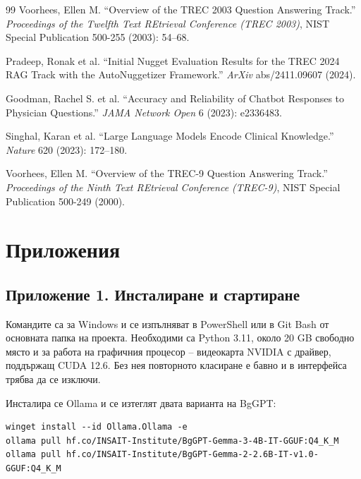 \documentclass[12pt,a4paper]{article}
\makeatletter
\let\origsection\section
\renewcommand{\section}{\clearpage\origsection}
\renewcommand\paragraph{\@startsection{paragraph}{4}{\z@}{1.5ex \@plus .5ex \@minus .2ex}{-1em}{\normalfont\normalsize\bfseries}}
\makeatother
\begin{document}
{\begin{thebibliography}{99}
Voorhees, Ellen M.
“Overview of the TREC 2003 Question Answering Track.”
\emph{Proceedings of the Twelfth Text REtrieval Conference (TREC 2003)}, NIST Special Publication 500-255 (2003): 54--68.

Pradeep, Ronak et al.
“Initial Nugget Evaluation Results for the TREC 2024 RAG Track with the AutoNuggetizer Framework.”
\emph{ArXiv} abs/2411.09607 (2024).

Goodman, Rachel S. et al.
“Accuracy and Reliability of Chatbot Responses to Physician Questions.”
\emph{JAMA Network Open} 6 (2023): e2336483.

Singhal, Karan et al.
“Large Language Models Encode Clinical Knowledge.”
\emph{Nature} 620 (2023): 172--180.

Voorhees, Ellen M.
“Overview of the TREC-9 Question Answering Track.”
\emph{Proceedings of the Ninth Text REtrieval Conference (TREC-9)}, NIST Special Publication 500-249 (2000).

\end{thebibliography}
}

\section*{Приложения}

\subsection*{Приложение 1. Инсталиране и стартиране}
\label{app:install}
Командите са за Windows и се изпълняват в PowerShell или в Git Bash от основната папка на проекта. Необходими са Python 3.11, около 20 GB свободно място и за работа на графичния процесор -- видеокарта NVIDIA с драйвер, поддържащ CUDA 12.6. Без нея повторното класиране е бавно и в интерфейса трябва да се изключи.

\paragraph{1. Генеративен модел.} Инсталира се Ollama и се изтеглят двата варианта на BgGPT:
\begin{lstlisting}
winget install --id Ollama.Ollama -e
ollama pull hf.co/INSAIT-Institute/BgGPT-Gemma-3-4B-IT-GGUF:Q4_K_M
ollama pull hf.co/INSAIT-Institute/BgGPT-Gemma-2-2.6B-IT-v1.0-GGUF:Q4_K_M
\end{lstlisting}
\end{document}
